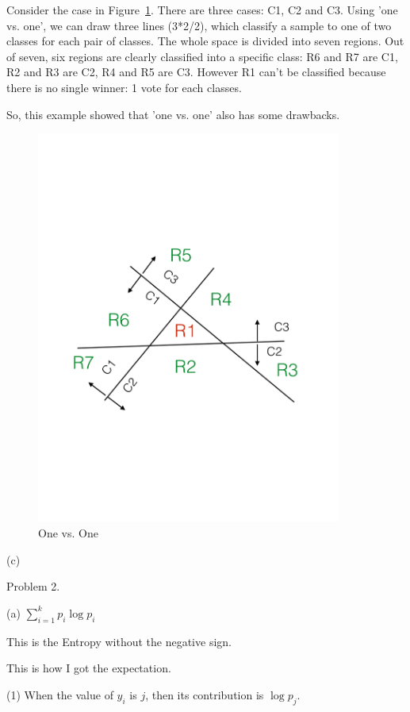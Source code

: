 \documentclass[11pt]{article}
\theoremstyle{definition}
\begin{document}
Consider the case in Figure~\ref{fig:one-one}. There are three cases: C1, C2 and C3. Using
'one vs. one', we can draw three lines (3*2/2), which classify a sample to one
of two classes for each pair of classes.  The whole space is divided into seven
regions.  Out of seven, six regions are clearly classified into a specific
class: R6 and R7 are C1, R2 and R3 are C2, R4 and R5 are C3.  However R1 can't
be classified because there is no single winner: 1 vote for each classes.

So, this example showed that 'one vs. one' also has some drawbacks.

\begin{figure}[h]
  \centering
  \includegraphics[width=10cm]{one-one}
  \caption{One vs. One}
  \label{fig:one-one}
\end{figure}

\pagebreak

(c)

\pagebreak

Problem 2.

\bigskip

(a)
$\sum_{i=1}^{k}p_i \log p_i$

This is the Entropy without the negative sign.

This is how I got the expectation.

(1) When the value of $y_i$ is $j$, then its contribution is $\log p_j$.
\end{document}
